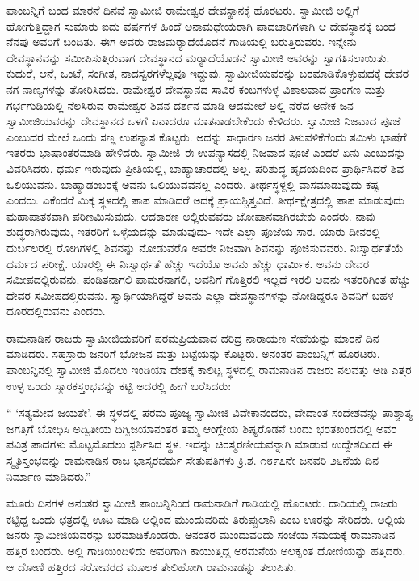  ಪಾಂಬನ್ನಿಗೆ ಬಂದ ಮಾರನೆ ದಿನವೆ ಸ್ವಾಮೀಜಿ ರಾಮೇಶ್ವರ ದೇವಸ್ಥಾನಕ್ಕೆ ಹೊರಟರು. ಸ್ವಾಮೀಜಿ ಅಲ್ಲಿಗೆ ಹೋಗುತ್ತಿದ್ದಾಗ ಸುಮಾರು ಐದು ವರ್ಷಗಳ ಹಿಂದೆ ಅನಾಮಧೇಯರಾಗಿ ಪಾದಚಾರಿಗಳಾಗಿ ಆ ದೇವಸ್ಥಾನಕ್ಕೆ ಬಂದ ನೆನಪು ಅವರಿಗೆ ಬಂದಿತು. ಈಗ ಅವರು ರಾಜಮರ‍್ಯಾದೆಯೊಡನೆ ಗಾಡಿಯಲ್ಲಿ ಬರುತ್ತಿರುವರು. ಇನ್ನೇನು ದೇವಸ್ಥಾನವನ್ನು ಸಮೀಪಿಸುತ್ತಿರುವಾಗ ದೇವಸ್ಥಾನದ ಮರ‍್ಯಾದೆಯೊಡನೆ ಸ್ವಾಮೀಜಿ ಅವರನ್ನು ಸ್ವಾಗತಿಸಲಾಯಿತು. ಕುದುರೆ, ಆನೆ, ಒಂಟೆ, ಸಂಗೀತ, ನಾದಸ್ವರಗಳೆಲ್ಲವೂ ಇದ್ದುವು. ಸ್ವಾಮೀಜಿಯವರನ್ನು ಬರಮಾಡಿಕೊಳ್ಳುವುದಕ್ಕೆ ದೇವರ ನಗ ನಾಣ್ಯಗಳನ್ನು ತೋರಿಸಿದರು. ರಾಮೇಶ್ವರ ದೇವಸ್ಥಾನದ ಸಾವಿರ ಕಂಬಗಳುಳ್ಳ ವಿಶಾಲವಾದ ಪ್ರಾಂಗಣ ಮತ್ತು ಗರ್ಭಗುಡಿಯಲ್ಲಿ ನೆಲಸಿರುವ ರಾಮೇಶ್ವರ ಶಿವನ ದರ್ಶನ ಮಾಡಿ ಆದಮೇಲೆ ಅಲ್ಲಿ ನೆರೆದ ಅನೇಕ ಜನ ಸ್ವಾಮೀಜಿಯವರನ್ನು ದೇವಸ್ಥಾನದ ಒಳಗೆ ಏನಾದರೂ ಮಾತನಾಡಬೇಕೆಂದು ಕೇಳಿದರು. ಸ್ವಾಮೀಜಿ ನಿಜವಾದ ಪೂಜೆ ಎಂಬುದರ ಮೇಲೆ ಒಂದು ಸಣ್ಣ ಉಪನ್ಯಾಸ ಕೊಟ್ಟರು. ಅದನ್ನು ಸಾಧಾರಣ ಜನರ ತಿಳುವಳಿಕೆಗೆಂದು ತಮಿಳು ಭಾಷೆಗೆ ಇತರರು ಭಾಷಾಂತರಮಾಡಿ ಹೇಳಿದರು. ಸ್ವಾಮೀಜಿ ಈ ಉಪನ್ಯಾಸದಲ್ಲಿ ನಿಜವಾದ ಪೂಜೆ ಎಂದರೆ ಏನು ಎಂಬುದನ್ನು ವಿವರಿಸಿದರು. ಧರ್ಮ ಇರುವುದು ಪ್ರೀತಿಯಲ್ಲಿ, ಬಾಹ್ಯಾಚಾರದಲ್ಲಿ ಅಲ್ಲ. ಪರಿಶುದ್ಧ ಹೃದಯದಿಂದ ಪ್ರಾರ್ಥಿಸಿದರೆ ಶಿವ ಒಲಿಯುವನು. ಬಾಹ್ಯಾಡಂಬರಕ್ಕೆ ಅವನು ಒಲಿಯುವವನಲ್ಲ ಎಂದರು. ತೀರ್ಥಸ್ಥಳ್ದಲ್ಲಿ ವಾಸಮಾಡುವುದು ಕಷ್ಟ ಎಂದರು. ಏಕೆಂದರೆ ಮಿಕ್ಕ ಸ್ಥಳದಲ್ಲಿ ಪಾಪ ಮಾಡಿದರೆ ಅದಕ್ಕೆ ಪ್ರಾಯಶ್ಚಿತ್ತವಿದೆ. ತೀರ್ಥಕ್ಷೇತ್ರದಲ್ಲಿ ಪಾಪ ಮಾಡುವುದು ಮಹಾಪಾತಕವಾಗಿ ಪರಿಣಮಿಸುವುದು. ಆದಕಾರಣ ಅಲ್ಲಿರುವವರು ಜೋಪಾನವಾಗಿರಬೇಕು ಎಂದರು. ನಾವು ಶುದ್ಧರಾಗಿರುವುದು, ಇತರರಿಗೆ ಒಳ್ಳೆಯದನ್ನು ಮಾಡುವುದು- ಇದೇ ಎಲ್ಲಾ ಪೂಜೆಯ ಸಾರ. ಯಾರು ದೀನರಲ್ಲಿ ದುರ್ಬಲರಲ್ಲಿ ರೋಗಿಗಳಲ್ಲಿ ಶಿವನನ್ನು ನೋಡುವರೊ ಅವರೇ ನಿಜವಾಗಿ ಶಿವನನ್ನು ಪೂಜಿಸುವವರು. ನಿಃಸ್ವಾರ್ಥತೆಯೆ ಧರ್ಮದ ಪರೀಕ್ಷೆ. ಯಾರಲ್ಲಿ ಈ ನಿಃಸ್ವಾರ್ಥತೆ ಹೆಚ್ಚು ಇದೆಯೊ ಅವನು ಹೆಚ್ಚು ಧಾರ್ಮಿಕ. ಅವನು ದೇವರ ಸಮೀಪದಲ್ಲಿರುವನು. ಪಂಡಿತನಾಗಲಿ ಪಾಮರನಾಗಲಿ, ಅವನಿಗೆ ಗೊತ್ತಿರಲಿ ಇಲ್ಲದೆ ಇರಲಿ ಅವನು ಇತರರಿಗಿಂತ ಹೆಚ್ಚು ದೇವರ ಸಮೀಪದಲ್ಲಿರುವನು. ಸ್ವಾರ್ಥಿಯಾಗಿದ್ದರೆ ಅವನು ಎಲ್ಲಾ ದೇವಸ್ಥಾನಗಳನ್ನು ನೋಡಿದ್ದರೂ ಶಿವನಿಗೆ ಬಹಳ ದೂರದಲ್ಲಿರುವನು ಎಂದರು. 

 ರಾಮನಾಡಿನ ರಾಜರು ಸ್ವಾಮೀಜಿಯವರಿಗೆ ಪರಮಪ್ರಿಯವಾದ ದರಿದ್ರ ನಾರಾಯಣ ಸೇವೆಯನ್ನು ಮಾರನೆ ದಿನ ಮಾಡಿದರು. ಸಹಸ್ರಾರು ಜನರಿಗೆ ಭೋಜನ ಮತ್ತು ಬಟ್ಟೆಯನ್ನು ಕೊಟ್ಟರು. ಅನಂತರ ಪಾಂಬನ್ನಿಗೆ ಹೊರಟರು. ಪಾಂಬನ್ನಿನಲ್ಲಿ ಸ್ವಾಮೀಜಿ ಮೊದಲು ಇಂಡಿಯಾ ದೇಶಕ್ಕೆ ಕಾಲಿಟ್ಟ ಸ್ಥಳದಲ್ಲಿ ರಾಮನಾಡಿನ ರಾಜರು ನಲವತ್ತು ಅಡಿ ಎತ್ತರ ಉಳ್ಳ ಒಂದು ಸ್ಮಾರಕಸ್ತಂಭವನ್ನು ಕಟ್ಟಿ ಅದರಲ್ಲಿ ಹೀಗೆ ಬರೆಸಿದರು: 

 “ ‘ಸತ್ಯಮೇವ ಜಯತೇ’. ಈ ಸ್ಥಳದಲ್ಲಿ ಪರಮ ಪೂಜ್ಯ ಸ್ವಾಮೀಜಿ ವಿವೇಕಾನಂದರು, ವೇದಾಂತ ಸಂದೇಶವನ್ನು ಪಾಶ್ಚಾತ್ಯ ಜಗತ್ತಿಗೆ ಬೋಧಿಸಿ ಅದ್ವಿತೀಯ ದಿಗ್ವಿಜಯಾನಂತರ ತಮ್ಮ ಆಂಗ್ಲೇಯ ಶಿಷ್ಯರೊಡನೆ ಬಂದು ಭರತಖಂಡದಲ್ಲಿ ಅವರ ಪವಿತ್ರ ಪಾದಗಳು ಮೊಟ್ಟಮೊದಲು ಸ್ಪರ್ಶಿಸಿದ ಸ್ಥಳ. ಇದನ್ನು ಚಿರಸ್ಮರಣೀಯವನ್ನಾಗಿ ಮಾಡುವ ಉದ್ದೇಶದಿಂದ ಈ ಸ್ಮೃತಿಸ್ತಂಭವನ್ನು ರಾಮನಾಡಿನ ರಾಜ ಭಾಸ್ಕರವರ್ಮ ಸೇತುಪತಿಗಳು ಕ್ರಿ.ಶ. ೧೮೯೭ನೇ ಜನವರಿ ೨೬ನೆಯ ದಿನ ನಿರ್ಮಾಣ ಮಾಡಿದರು.” 

 ಮೂರು ದಿನಗಳ ಅನಂತರ ಸ್ವಾಮೀಜಿ ಪಾಂಬನ್ನಿನಿಂದ ರಾಮನಾಡಿಗೆ ಗಾಡಿಯಲ್ಲಿ ಹೊರಟರು. ದಾರಿಯಲ್ಲಿ ರಾಜರು ಕಟ್ಟಿದ್ದ ಒಂದು ಛತ್ರದಲ್ಲಿ ಊಟ ಮಾಡಿ ಅಲ್ಲಿಂದ ಮುಂದುವರಿದು ತಿರುಪ್ಪುಲಾನಿ ಎಂಬ ಊರನ್ನು ಸೇರಿದರು. ಅಲ್ಲಿಯ ಜನರು ಸ್ವಾಮೀಜಿಯವರನ್ನು ಬರಮಾಡಿಕೊಂಡರು. ಅನಂತರ ಮುಂದುವರಿದು ಸಂಜೆಯ ಸಮಯಕ್ಕೆ ರಾಮನಾಡಿನ ಹತ್ತಿರ ಬಂದರು. ಅಲ್ಲಿ ಗಾಡಿಯಿಂದಿಳಿದು ಅವರಿಗಾಗಿ ಕಾಯುತ್ತಿದ್ದ ಅರಮನೆಯ ಅಲಕೃಂತ ದೋಣಿಯನ್ನು ಹತ್ತಿದರು. ಆ ದೋಣಿ ಹತ್ತಿರದ ಸರೋವರದ ಮೂಲಕ ತೇಲಿಹೋಗಿ ರಾಮನಾಡನ್ನು ತಲುಪಿತು. 

